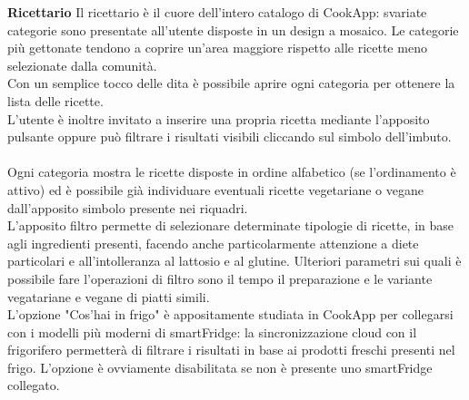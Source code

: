 \textbf{Ricettario}
Il ricettario è il cuore dell'intero catalogo di CookApp: svariate categorie sono presentate all'utente disposte in un design a mosaico. Le categorie più gettonate tendono a coprire un'area maggiore rispetto alle ricette meno selezionate dalla comunità.\\
Con un semplice tocco delle dita è possibile aprire ogni categoria per ottenere la lista delle ricette.\\
L'utente è inoltre invitato a inserire una propria ricetta mediante l'apposito pulsante oppure può filtrare i risultati visibili cliccando sul simbolo dell'imbuto.\\\\

Ogni categoria mostra le ricette disposte in ordine alfabetico (se l'ordinamento è attivo) ed è possibile già individuare eventuali ricette vegetariane o vegane dall'apposito simbolo presente nei riquadri.\\
L'apposito filtro permette di selezionare determinate tipologie di ricette, in base agli ingredienti presenti, facendo anche particolarmente attenzione a diete particolari e all'intolleranza al lattosio e al glutine. Ulteriori parametri sui quali è possibile fare l'operazioni di filtro sono il tempo il preparazione e le variante vegatariane e vegane di piatti simili.\\
L'opzione "Cos'hai in frigo" è appositamente studiata in CookApp per collegarsi con i modelli più moderni di smartFridge: la sincronizzazione cloud con il frigorifero permetterà di filtrare i risultati in base ai prodotti freschi presenti nel frigo. L'opzione è ovviamente disabilitata se non è presente uno smartFridge collegato.\\

